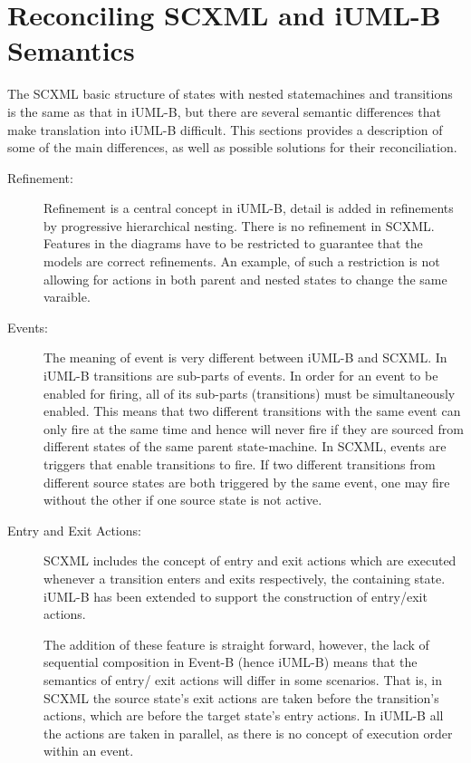 
\section{Reconciling SCXML and iUML-B Semantics}
\label{sect:recon}

The SCXML basic structure of states with nested 
statemachines and transitions is the same as that 
in iUML-B, but there are several semantic 
differences that make translation into iUML-B difficult. 
This sections provides a description of some of the
main differences, as well as possible solutions for their
reconciliation.

\begin{description}
\item [Refinement:]
Refinement is a central concept in iUML-B, detail is 
added in refinements by progressive hierarchical 
nesting. There is no refinement in SCXML. Features
in the diagrams have to be restricted to guarantee
that the models are correct refinements. An example,
of such a restriction is not allowing for actions in 
both parent and nested states to change the same varaible.

\item [Events:]
The meaning of event is very different between iUML-B 
and SCXML. In iUML-B transitions are sub-parts of 
events. In order for an event to be enabled for firing, 
all of its sub-parts (transitions) must be 
simultaneously enabled. This means that two different 
transitions with the same event can only fire at the 
same time and hence will never fire if they are sourced 
from different states of the same parent state-machine. 
In SCXML, events are triggers that enable transitions 
to fire. If two different transitions from different 
source states are both triggered by the same event, one 
may fire without the other if one source state is not 
active.

\item [Entry and Exit Actions:]
SCXML includes the concept of entry and exit actions 
which are executed whenever a transition enters and 
exits respectively, the containing state. 
iUML-B has been extended to support the construction 
of entry/exit actions.

The addition of these feature is straight forward,
however, the lack of sequential composition in 
Event-B (hence iUML-B) means that the semantics of entry/
exit actions will differ in some scenarios. That is, in 
SCXML the source state’s exit actions are taken before the 
transition’s actions, which are before the target state’s 
entry actions. In iUML-B all the actions are taken in 
parallel, as there is no concept of execution order within 
an event. 


\end{description}
